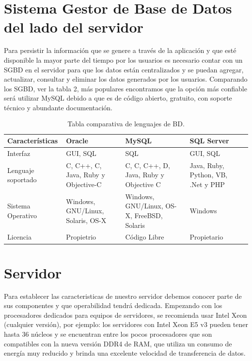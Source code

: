	
	\section{Sistema Gestor de Base de Datos del lado del servidor}
	\noindent Para persistir la información que se genere a través de la aplicación y que esté disponible la mayor parte del tiempo por los usuarios es necesario contar con un SGBD en el servidor para que los datos están centralizados y se puedan agregar, actualizar, consultar y eliminar los datos generados por los usuarios. Comparando los SGBD, ver la tabla 2, más populares encontramos que la opción más confiable será utilizar MySQL debido a que es de código abierto, gratuito, con soporte técnico y abundante documentación. 
	
	\begin{table}[htbp]
		\begin{center}
			\begin{tabular}{|l|p{35mm}|p{35mm}|p{35mm}|l}
				\hline
				Caracter\'isticas & Oracle & MySQL & SQL Server \\
				\hline 
				Interfaz & GUI, SQL & SQL & GUI, SQL \\ \hline
				Lenguaje soportado & C, C++, C, Java, Ruby y Objective-C & C, C, C++, D, Java, Ruby y Objective C & Java, Ruby, Python, VB, .Net y PHP  \\ \hline
				Sistema Operativo & Windows, GNU/Linux, Solaris, OS-X & Windows, GNU/Linux, OS-X, FreeBSD, Solaris & Windows \\ \hline
				Licencia & Propietrio & Código Libre & Propietario \\ \hline
			\end{tabular}
			\caption{Tabla comparativa de lenguajes de BD.}
			\label{tabla:sencilla}
		\end{center}
	\end{table}
	\pagebreak
	

	\section{Servidor}
	\noindent Para establecer las caracteristicas de nuestro servidor debemos conocer parte de sus componentes y que operabilidad tendrá dedicada.
	Empezando con los procesadores dedicados para equipos de servidores, se recomienda usar Intel Xeon (cualquier versión), por ejemplo: los servidores con Intel Xeon E5 v3 pueden tener hasta 36 núcleos y se encuentran entre los pocos procesadores que son compatibles con la nueva versión DDR4 de RAM, que utiliza un consumo de energía muy reducido y brinda una excelente velocidad de transferencia de datos.\cite{serv}
	
